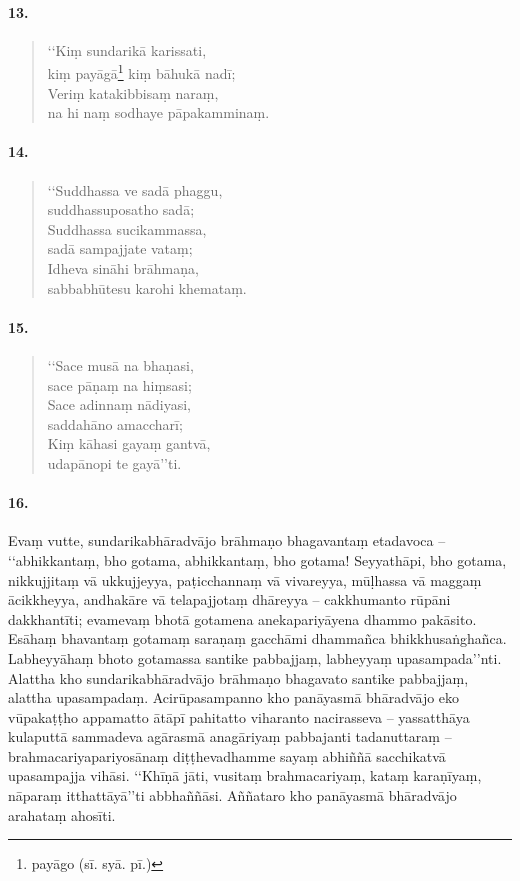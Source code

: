 \paragraph{13.}\begin{verse}
  ‘‘Kiṃ sundarikā karissati, \\kiṃ payāgā\footnote{payāgo (sī. syā. pī.)} kiṃ bāhukā nadī;\\
  Veriṃ katakibbisaṃ naraṃ, \\na hi naṃ sodhaye pāpakamminaṃ.
\end{verse}

\paragraph{14.}\begin{verse}
  ‘‘Suddhassa ve sadā phaggu, \\suddhassuposatho sadā;\\
  Suddhassa sucikammassa, \\sadā sampajjate vataṃ;\\
  Idheva sināhi brāhmaṇa, \\sabbabhūtesu karohi khemataṃ.
\end{verse}

\paragraph{15.}\begin{verse}
  ‘‘Sace musā na bhaṇasi, \\sace pāṇaṃ na hiṃsasi;\\
  Sace adinnaṃ nādiyasi, \\saddahāno amaccharī;\\
  Kiṃ kāhasi gayaṃ gantvā, \\udapānopi te gayā’’ti.
\end{verse}

\paragraph{16.} Evaṃ vutte, sundarikabhāradvājo brāhmaṇo bhagavantaṃ etadavoca – ‘‘abhikkantaṃ, bho gotama, abhikkantaṃ, bho gotama! Seyyathāpi, bho gotama, nikkujjitaṃ vā ukkujjeyya, paṭicchannaṃ vā vivareyya, mūḷhassa vā maggaṃ ācikkheyya, andhakāre vā telapajjotaṃ dhāreyya – cakkhumanto rūpāni dakkhantīti; evamevaṃ bhotā gotamena anekapariyāyena dhammo pakāsito. Esāhaṃ bhavantaṃ gotamaṃ saraṇaṃ gacchāmi dhammañca bhikkhusaṅghañca. Labheyyāhaṃ bhoto gotamassa santike pabbajjaṃ, labheyyaṃ upasampada’’nti. Alattha kho sundarikabhāradvājo brāhmaṇo bhagavato santike pabbajjaṃ, alattha upasampadaṃ. Acirūpasampanno kho panāyasmā bhāradvājo eko vūpakaṭṭho appamatto ātāpī pahitatto viharanto nacirasseva – yassatthāya kulaputtā sammadeva agārasmā anagāriyaṃ pabbajanti tadanuttaraṃ – brahmacariyapariyosānaṃ diṭṭhevadhamme sayaṃ abhiññā sacchikatvā upasampajja vihāsi. ‘‘Khīṇā jāti, vusitaṃ brahmacariyaṃ, kataṃ karaṇīyaṃ, nāparaṃ itthattāyā’’ti abbhaññāsi. Aññataro kho panāyasmā bhāradvājo arahataṃ ahosīti.

